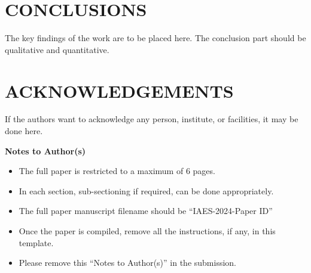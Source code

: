 \documentclass[10pt, conference]{IAES2024}
\begin{document}
\section{\textbf{CONCLUSIONS}}\label{sec4}
The key findings of the work are to be placed here. The conclusion part should be qualitative and quantitative. 

\vspace{0.1cm}
\noindent
\section*{\textbf{ACKNOWLEDGEMENTS}}
\noindent If the authors want to acknowledge any person, institute, or facilities, it may be done here. 




\vspace{0.5cm}
\noindent
\textbf{Notes to Author(s)}
\begin{itemize}
\item{The full paper is restricted to a maximum of 6 pages.}
\item{In each section, sub-sectioning if required, can be done appropriately.}
\item{The full paper manuscript filename should be ``IAES-2024-Paper ID''}
\item{Once the paper is compiled, remove all the instructions, if any, in this template.}
\item{Please remove this ``Notes to Author(s)'' in the submission.}
\end{itemize}
\end{document}
